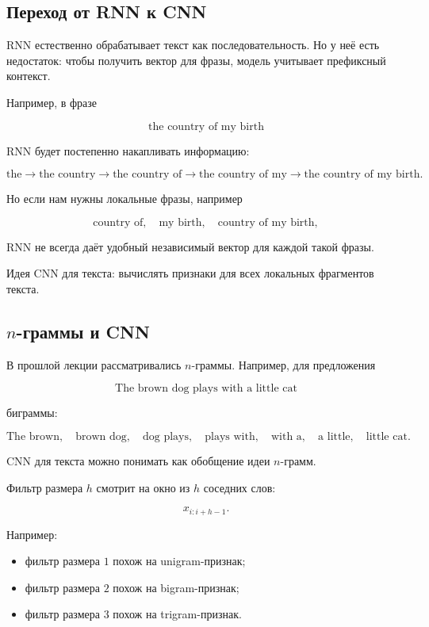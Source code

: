 \documentclass[a4paper,12pt]{article}
\begin{document}
\subsection{Переход от RNN к CNN}

RNN естественно обрабатывает текст как последовательность. Но у неё есть недостаток: чтобы получить вектор для фразы, модель учитывает префиксный контекст.

Например, в фразе

\[
\text{the country of my birth}
\]

RNN будет постепенно накапливать информацию:

\[
\text{the}
\rightarrow
\text{the country}
\rightarrow
\text{the country of}
\rightarrow
\text{the country of my}
\rightarrow
\text{the country of my birth}.
\]

Но если нам нужны локальные фразы, например

\[
\text{country of}, \quad
\text{my birth}, \quad
\text{country of my birth},
\]

RNN не всегда даёт удобный независимый вектор для каждой такой фразы.

Идея CNN для текста: вычислять признаки для всех локальных фрагментов текста.


\subsection{\texorpdfstring{\(n\)-граммы}{n-граммы} и CNN}

В прошлой лекции рассматривались \(n\)-граммы. Например, для предложения

\[
\text{The brown dog plays with a little cat}
\]

биграммы:

\[
\text{The brown}, \quad
\text{brown dog}, \quad
\text{dog plays}, \quad
\text{plays with}, \quad
\text{with a}, \quad
\text{a little}, \quad
\text{little cat}.
\]

CNN для текста можно понимать как обобщение идеи \(n\)-грамм.

Фильтр размера \(h\) смотрит на окно из \(h\) соседних слов:

\[
x_{i:i+h-1}.
\]

Например:

\begin{itemize}
    \item фильтр размера \(1\) похож на unigram-признак;
    \item фильтр размера \(2\) похож на bigram-признак;
    \item фильтр размера \(3\) похож на trigram-признак.
\end{itemize}
\end{document}
